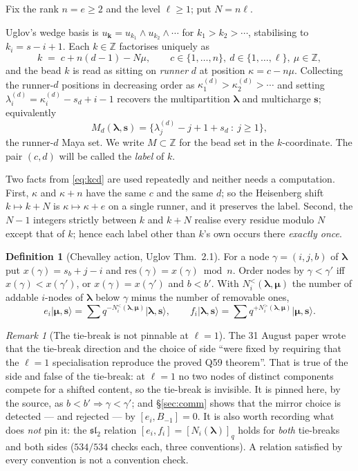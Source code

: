 \documentclass[11pt]{article}
\theoremstyle{definition}
\newtheorem{definition}[theorem]{Definition}
\theoremstyle{remark}
\newtheorem{remark}[theorem]{Remark}
\newcommand{\Z}{\mathbb{Z}}
\newcommand{\bl}{\boldsymbol{\lambda}}
\newcommand{\bs}{\mathbf{s}}
\newcommand{\bk}{\mathbf{k}}
\newcommand{\ket}[1]{\lvert #1 \rangle}
\begin{document}
Fix the rank $n=e\ge2$ and the level $\ell\ge1$; put $N=n\ell$.

Uglov's wedge basis is $u_{\bk}=u_{k_1}\wedge u_{k_2}\wedge\cdots$ for
$k_1>k_2>\cdots$, stabilising to $k_i=s-i+1$. Each $k\in\Z$ factorises uniquely as
\begin{equation}\label{eq:kcd}
k \;=\; c + n(d-1) - N\mu,\qquad c\in\{1,\dots,n\},\ d\in\{1,\dots,\ell\},\ \mu\in\Z,
\end{equation}
and the bead $k$ is read as sitting on \emph{runner} $d$ at position $\kappa=c-n\mu$.
Collecting the runner-$d$ positions in decreasing order as $\kappa^{(d)}_1>\kappa^{(d)}_2>\cdots$
and setting $\lambda^{(d)}_i=\kappa^{(d)}_i-s_d+i-1$ recovers the multipartition
$\bl$ and multicharge $\bs$; equivalently
\[
M_d(\bl,\bs)=\{\lambda^{(d)}_j-j+1+s_d\ :\ j\ge1\},
\]
the runner-$d$ Maya set. We write $M\subset\Z$ for the bead set in the $k$-coordinate.
The pair $(c,d)$ will be called the \emph{label} of $k$.

Two facts from \eqref{eq:kcd} are used repeatedly and neither needs a computation.
First, $\kappa$ and $\kappa+n$ have the same $c$ and the same $d$; so the Heisenberg
shift $k\mapsto k+N$ is $\kappa\mapsto\kappa+e$ on a single runner, and it preserves the
label. Second, the $N-1$ integers strictly between $k$ and $k+N$ realise every residue
modulo $N$ except that of $k$; hence each label other than $k$'s own occurs there
\emph{exactly once}.

\begin{definition}[Chevalley action, Uglov Thm.\ 2.1]\label{def:chev}
For a node $\gamma=(i,j,b)$ of $\bl$ put $x(\gamma)=s_b+j-i$ and
$\mathrm{res}(\gamma)=x(\gamma)\bmod n$. Order nodes by
$\gamma<\gamma'$ iff $x(\gamma)<x(\gamma')$, or $x(\gamma)=x(\gamma')$ and $b<b'$.
With $N^{<}_i(\bl,\boldsymbol\mu)$ the number of addable $i$-nodes of $\bl$ below
$\gamma$ minus the number of removable ones,
\[
e_i\ket{\boldsymbol\mu,\bs}=\sum q^{-N^{<}_i(\bl,\boldsymbol\mu)}\ket{\bl,\bs},
\qquad
f_i\ket{\bl,\bs}=\sum q^{+N^{>}_i(\bl,\boldsymbol\mu)}\ket{\boldsymbol\mu,\bs}.
\]
\end{definition}

\begin{remark}[The tie-break is not pinnable at $\ell=1$]\label{rem:tie}
The 31 August paper wrote that the tie-break direction and the choice of side ``were
fixed by requiring that the $\ell=1$ specialisation reproduce the proved Q59 theorem''.
That is true of the side and false of the tie-break: at $\ell=1$ no two nodes of distinct
components compete for a shifted content, so the tie-break is invisible. It is pinned
here, by the source, as $b<b'\Rightarrow\gamma<\gamma'$; and \S\ref{sec:comm} shows that
the mirror choice is detected --- and rejected --- by $[e_i,B_{-1}]=0$. It is also worth
recording what does \emph{not} pin it: the $\mathfrak{sl}_2$ relation
$[e_i,f_i]=[N_i(\bl)]_q$ holds for \emph{both} tie-breaks and both sides
($534/534$ checks each, three conventions). A relation satisfied by every convention is
not a convention check.
\end{remark}
\end{document}
